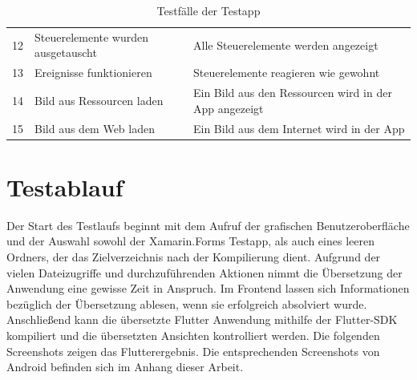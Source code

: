 \begin{table}[!ht]
\begin{tabularx}{\textwidth}{l|l|X}
12            & Steuerelemente wurden ausgetauscht           	& Alle Steuerelemente werden angezeigt        			 \\ 
13            & Ereignisse funktionieren           	&  Steuerelemente reagieren wie gewohnt     			 \\ 
14            & Bild aus Ressourcen laden           	& Ein Bild aus den Ressourcen wird in der App angezeigt                      			 \\ 
15             & Bild aus dem Web laden           	& Ein Bild aus dem Internet wird in der App                      			 \\ 
\end{tabularx}
\caption{Testfälle der Testapp}
 \label{tab:Testapp}
\end{table}



\section{Testablauf}
Der Start  des Testlaufs beginnt mit dem Aufruf der grafischen Benutzeroberfläche und der Auswahl sowohl der Xamarin.Forms Testapp, als auch eines leeren Ordners, der das Zielverzeichnis nach der Kompilierung dient. 
Aufgrund der vielen Dateizugriffe und durchzuführenden Aktionen nimmt die Übersetzung der Anwendung eine gewisse Zeit in Anspruch.  Im Frontend lassen sich Informationen bezüglich der Übersetzung ablesen, wenn sie erfolgreich absolviert wurde.  Anschließend kann die übersetzte Flutter Anwendung mithilfe der Flutter-SDK kompiliert und die übersetzten Ansichten kontrolliert werden.  Die folgenden Screenshots zeigen das Flutterergebnis. Die entsprechenden Screenshots von Android befinden sich im Anhang dieser Arbeit.

